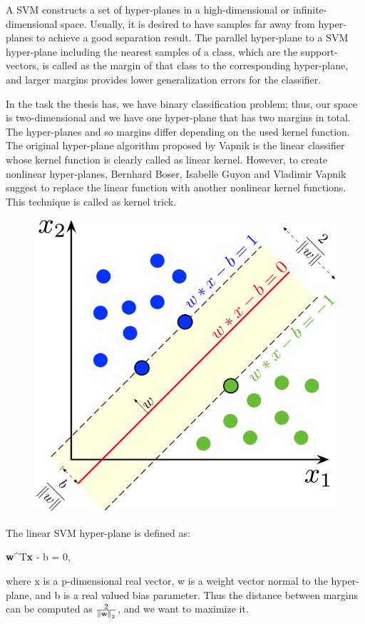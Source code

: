 A SVM constructs a set of hyper-planes in a high-dimensional or infinite-dimensional space. Usually, it is desired to have samples far away from hyper-planes to achieve a good separation result. The parallel hyper-plane to a SVM hyper-plane including the nearest samples of a class, which are the support-vectors, is called as the margin of that class to the corresponding hyper-plane, and larger margins provides lower generalization errors for the classifier.

In the task the thesis has, we have binary classification problem; thus, our space is two-dimensional and we have one hyper-plane that has two margins in total. The hyper-planes and so margins differ depending on the used kernel function. The original hyper-plane algorithm proposed by Vapnik is the linear classifier whose kernel function is clearly called as linear kernel. However, to create nonlinear hyper-planes, Bernhard Boser, Isabelle Guyon and Vladimir Vapnik suggest to replace the linear function with another nonlinear kernel functions. This technique is called as kernel trick.

\begin{figure}[h]
	\centering
	\includegraphics[width=.4\linewidth]{fig/SVM_margin_binary.png}
	\vspace*{2mm}
	\label{simple_svm}
\end{figure}

The linear SVM hyper-plane is defined as:

\be
\label{eq:linear_hyperplane}
\textbf{w}^{T}\textbf{x} - b = 0,
\ee

where x is a p-dimensional real vector, w is a weight vector normal to the hyper-plane, and b is a real valued bias parameter. Thus the distance between margins can be computed as $\frac{2}{\left\lVert\textbf{w}\right\rVert_{2}}$, and we want to maximize it.

